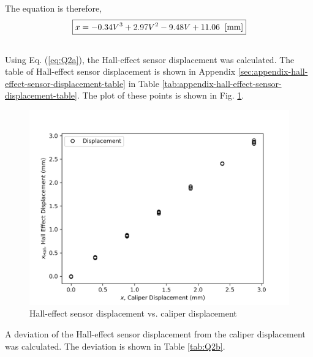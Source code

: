 The equation is therefore,
\begin{equation}
    \boxed{x = -0.34V^3 + 2.97V^2 - 9.48V + 11.06 \;\; [\si[]{mm}]} \label{eq:Q2a}
\end{equation}

\subsection{}

Using Eq. (\ref{eq:Q2a}), the Hall-effect sensor displacement was calculated. The table of Hall-effect sensor displacement is 
shown in Appendix \ref{sec:appendix-hall-effect-sensor-displacement-table} in Table \ref{tab:appendix-hall-effect-sensor-displacement-table}.
The plot of these points is shown in Fig. \ref{fig:Q2b}.

\begin{figure}[h]
    \centering
    \includegraphics[width=0.8\linewidth]{matplotlib/Q2b.png}
    \caption{Hall-effect sensor displacement vs. caliper displacement}
    \label{fig:Q2b}
\end{figure}

A deviation of the Hall-effect sensor displacement from the caliper displacement was calculated. The deviation is shown in Table \ref{tab:Q2b}.

